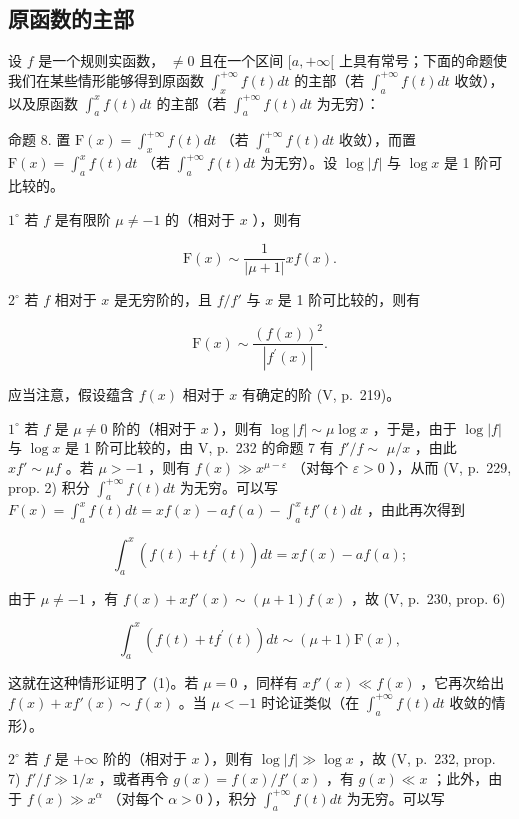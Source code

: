 \subsection{原函数的主部}

设 \(f\) 是一个规则实函数， \(\neq 0\) 且在一个区间 \([a, +\infty[\) 上具有常号；下面的命题使我们在某些情形能够得到原函数 \(\int_{x}^{+\infty} f(t) dt\) 的主部（若 \(\int_{a}^{+\infty} f(t) dt\) 收敛），以及原函数 \(\int_{a}^{x} f(t) dt\) 的主部（若 \(\int_{a}^{+\infty} f(t) dt\) 为无穷）：

命题 8. 置 \(\mathrm{F}(x) = \int_{x}^{+\infty} f(t) dt\) （若 \(\int_{a}^{+\infty} f(t) dt\) 收敛），而置 \(\mathrm{F}(x) = \int_{a}^{x} f(t) dt\) （若 \(\int_{a}^{+\infty} f(t) dt\) 为无穷）。设 \(\log |f|\) 与 \(\log x\) 是 1 阶可比较的。

\(1^{\circ}\) 若 \(f\) 是有限阶 \(\mu \neq -1\) 的（相对于 \(x\) ），则有

\[
\mathrm{F} (x) \sim \frac {1}{| \mu + 1 |} x f (x).\tag{1}
\]

\(2^{\circ}\) 若 \(f\) 相对于 \(x\) 是无穷阶的，且 \(f / f'\) 与 \(x\) 是 1 阶可比较的，则有

\[
\mathrm{F} (x) \sim \frac {(f (x)) ^ {2}}{| f ^ {\prime} (x) |}.\tag{2}
\]

应当注意，假设蕴含 \(f(x)\) 相对于 \(x\) 有确定的阶 (V, p.~219)。

\(1^{\circ}\) 若 \(f\) 是 \(\mu \neq 0\) 阶的（相对于 \(x\) ），则有 \(\log |f| \sim \mu \log x\) ，于是，由于 \(\log |f|\) 与 \(\log x\) 是 1 阶可比较的，由 V, p.~232 的命题 7 有 \(f'/f \sim\) \(\mu/x\) ，由此 \(xf' \sim \mu f\) 。若 \(\mu > -1\) ，则有 \(f(x) \gg x^{\mu-\varepsilon}\) （对每个 \(\varepsilon > 0\) ），从而 (V, p.~229, prop. 2) 积分 \(\int_{a}^{+\infty} f(t) dt\) 为无穷。可以写 \(F(x) = \int_{a}^{x} f(t) dt = xf(x) - af(a) - \int_{a}^{x} tf'(t) dt\) ，由此再次得到

\[
\int_ {a} ^ {x} \left(f (t) + t f ^ {\prime} (t)\right) d t = x f (x) - a f (a);
\]

由于 \(\mu \neq -1\) ，有 \(f(x) + xf'(x) \sim (\mu + 1)f(x)\) ，故 (V, p.~230, prop. 6)

\[
\int_ {a} ^ {x} \left(f (t) + t f ^ {\prime} (t)\right) d t \sim (\mu + 1) \mathrm{F} (x),
\]

这就在这种情形证明了 (1)。若 \(\mu = 0\) ，同样有 \(xf'(x) \ll f(x)\) ，它再次给出 \(f(x) + xf'(x) \sim f(x)\) 。当 \(\mu < -1\) 时论证类似（在 \(\int_{a}^{+\infty} f(t) dt\) 收敛的情形）。

\(2^{\circ}\) 若 \(f\) 是 \(+\infty\) 阶的（相对于 \(x\) ），则有 \(\log |f| \gg \log x\) ，故 (V, p.~232, prop. 7) \(f'/f \gg 1/x\) ，或者再令 \(g(x) = f(x)/f'(x)\) ，有 \(g(x) \ll x\) ；此外，由于 \(f(x) \gg x^{\alpha}\) （对每个 \(\alpha > 0\) ），积分 \(\int_{a}^{+\infty} f(t) dt\) 为无穷。可以写


